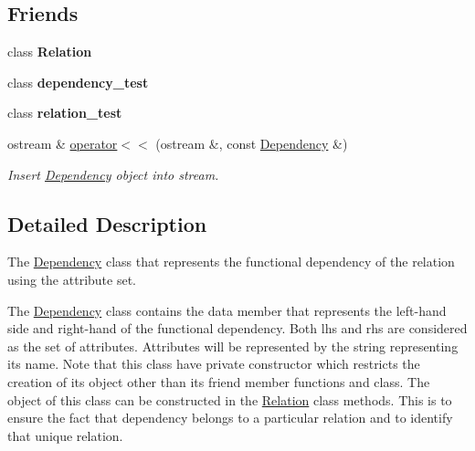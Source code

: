 \subsection*{Friends}
\begin{DoxyCompactItemize}
\item 
class {\bfseries Relation}\hypertarget{class_dependency_a7ee004262f27f8c916688911a71e3aa1}{}\label{class_dependency_a7ee004262f27f8c916688911a71e3aa1}

\item 
class {\bfseries dependency\+\_\+test}\hypertarget{class_dependency_a7f472ce92e998f92bf7b3858a37c9840}{}\label{class_dependency_a7f472ce92e998f92bf7b3858a37c9840}

\item 
class {\bfseries relation\+\_\+test}\hypertarget{class_dependency_a63c24e6ee30b65a5c236cef9ff6669bf}{}\label{class_dependency_a63c24e6ee30b65a5c236cef9ff6669bf}

\item 
ostream \& \hyperlink{class_dependency_a9fb9b97e81034d3b367ad1efc7bb6347}{operator$<$$<$} (ostream \&, const \hyperlink{class_dependency}{Dependency} \&)\hypertarget{class_dependency_a9fb9b97e81034d3b367ad1efc7bb6347}{}\label{class_dependency_a9fb9b97e81034d3b367ad1efc7bb6347}

\begin{DoxyCompactList}\small\item\em Insert \hyperlink{class_dependency}{Dependency} object into stream. \end{DoxyCompactList}\end{DoxyCompactItemize}


\subsection{Detailed Description}
The \hyperlink{class_dependency}{Dependency} class that represents the functional dependency of the relation using the attribute set. 

The \hyperlink{class_dependency}{Dependency} class contains the data member that represents the left-\/hand side and right-\/hand of the functional dependency. Both lhs and rhs are considered as the set of attributes. Attributes will be represented by the string representing its name. Note that this class have private constructor which restricts the creation of its object other than its friend member functions and class. The object of this class can be constructed in the \hyperlink{class_relation}{Relation} class methods. This is to ensure the fact that dependency belongs to a particular relation and to identify that unique relation. 

